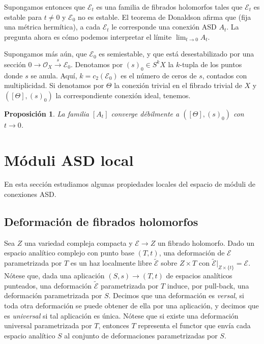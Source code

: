 \documentclass[12pt, a4paper]{amsart}
\newcommand\EE{\mathscr{E}}
\newcommand\OO{\mathscr{O}}
\newtheorem{prop}[thm]{Proposición}
\theoremstyle{remark} \newtheorem{rmk}[thm]{Observación}
\theoremstyle{remark} \newtheorem{rmks}[thm]{Observaciones}
\theoremstyle{definition} \newtheorem{defn}[thm]{Definición}
\theoremstyle{definition} \newtheorem{ejs}[thm]{Ejemplos}
\theoremstyle{definition} \newtheorem{ej}[thm]{Ejemplo}
\begin{document}
Supongamos entonces que $\EE_t$ es una familia de fibrados holomorfos tales que $\EE_t$ es estable para $t\neq 0$ y $\EE_0$ no es estable. El teorema de Donaldson afirma que (fija una métrica hermítica), a cada $\EE_t$ le corresponde una conexión ASD $A_t$. La pregunta ahora es cómo podemos interpretar el límite $\lim_{t\rightarrow 0} A_t$.

Supongamos más aún, que $\EE_0$ es semiestable, y que está desestabilizado por una sección $0\rightarrow \OO_X \overset{s}{\rightarrow} \EE_0$. Denotamos por $(s)_0 \in S^k X$ la $k$-tupla de los puntos donde $s$ se anula. Aquí, $k=c_2(\EE_0)$ es el número de ceros de $s$, contados con multiplicidad. Si denotamos por $\Theta$ la conexión trivial en el fibrado trivial de $X$ y $([\Theta],(s)_0)$ la correspondiente conexión ideal, tenemos.

\begin{prop}
	La familia $[A_t]$ converge débilmente a $([\Theta],(s)_0)$ con $t\rightarrow 0$.	
\end{prop}

\section{Móduli ASD local}
En esta sección estudiamos algunas propiedades locales del espacio de móduli de conexiones ASD.
\subsection{Deformación de fibrados holomorfos}
Sea $Z$ una variedad compleja compacta y $\EE\rightarrow Z$ un fibrado holomorfo. Dado un espacio analítico complejo con punto base $(T,t)$, una deformación de $\EE$ parametrizada por $T$ es un haz localmente libre $\tilde{\EE}$ sobre $Z\times T$ con $\tilde{\EE}|_{Z\times \{t\}}=\EE$. Nótese que, dada una aplicación $(S,s)\rightarrow (T,t)$ de espacios analíticos punteados, una deformación $\tilde{\EE}$ parametrizada por $T$ induce, por pull-back, una deformación parametrizada por $S$. Decimos que una deformación es \emph{versal}, si toda otra deformación se puede obtener de ella por una aplicación, y decimos que es \emph{universal} si tal aplicación es única. Nótese que si existe una deformación universal parametrizada por $T$, entonces $T$ representa el functor que envía cada espacio analítico $S$ al conjunto de deformaciones parametrizadas por $S$.
\end{document}
